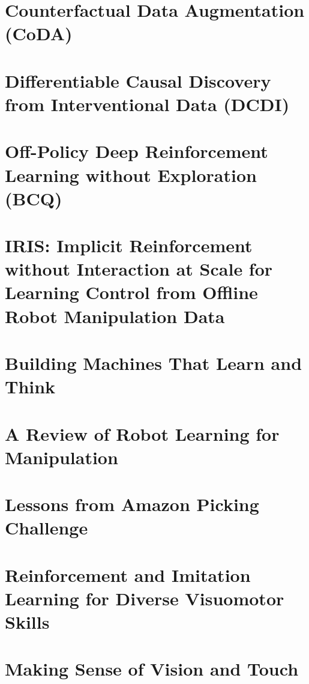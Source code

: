 \documentclass[../main.tex]{subfiles}
\begin{document}
\section{Counterfactual Data Augmentation (CoDA)}


\section{Differentiable Causal Discovery from Interventional Data (DCDI)}


\section{Off-Policy Deep Reinforcement Learning without Exploration (BCQ)}


\section{IRIS: Implicit Reinforcement without Interaction at Scale for Learning Control from Offline Robot Manipulation Data}


\section{Building Machines That Learn and Think}


\section{A Review of Robot Learning for Manipulation}


\section{Lessons from Amazon Picking Challenge}


\section{Reinforcement and Imitation Learning for Diverse Visuomotor Skills}


\section{Making Sense of Vision and Touch}

\end{document}
